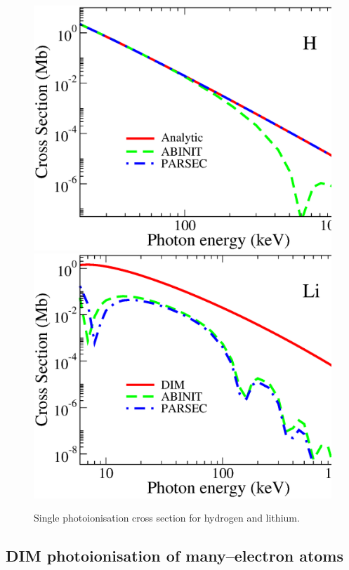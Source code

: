 \documentclass[10pt]{article}
\begin{document}
\begin{figure}[H]
\centering
 \includegraphics[height=0.23\textheight]{figures/pseudopot/photoionH.eps}
 \hspace{0.2cm}
 \includegraphics[height=0.23\textheight]{figures/pseudopot/photoionLi.eps}
\caption{Single photoionisation cross section for hydrogen 
and lithium.}
 \label{fig:photoHLi}
\end{figure}

\subsection{DIM photoionisation of many--electron atoms}
\end{document}

